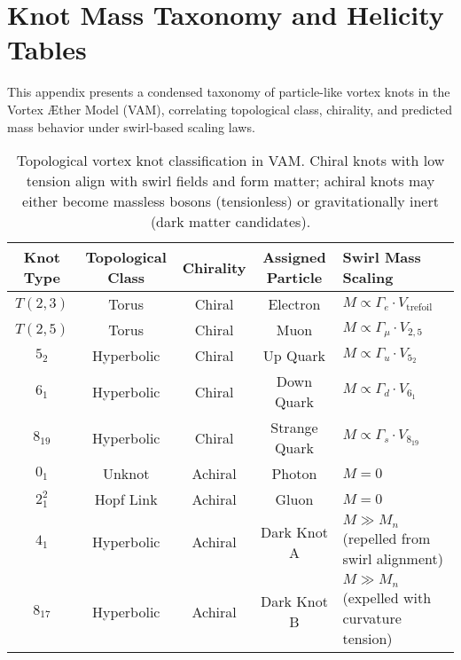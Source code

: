 \documentclass[preprint]{revtex4-2}
\begin{document}
        \section{Knot Mass Taxonomy and Helicity Tables}
        \label{sec:knot_mass_taxonomy}
            This appendix presents a condensed taxonomy of particle-like vortex knots in the Vortex \AE{}ther Model (VAM), correlating topological class, chirality, and predicted mass behavior under swirl-based scaling laws.
        
            \begin{table}[H]
                \centering
                \footnotesize
                \begin{tabular}{|c|c|c|c|l|}
                    \hline
                    \textbf{Knot Type} & \textbf{Topological Class} & \textbf{Chirality} & \textbf{Assigned Particle} & \textbf{Swirl Mass Scaling} \\
                    \hline
                    $T(2,3)$           & Torus            & Chiral   & Electron        & $M \propto \Gamma_{e} \cdot V_{\text{trefoil}}$ \\
                    $T(2,5)$           & Torus            & Chiral   & Muon            & $M \propto \Gamma_{\mu} \cdot V_{2,5}$ \\
                    $5_2$              & Hyperbolic       & Chiral   & Up Quark        & $M \propto \Gamma_{u} \cdot V_{5_2}$ \\
                    $6_1$              & Hyperbolic       & Chiral   & Down Quark      & $M \propto \Gamma_{d} \cdot V_{6_1}$ \\
                    $8_{19}$           & Hyperbolic       & Chiral   & Strange Quark   & $M \propto \Gamma_{s} \cdot V_{8_{19}}$ \\
                    $0_1$              & Unknot           & Achiral  & Photon          & $M = 0$ \\
                    $2_1^2$            & Hopf Link        & Achiral  & Gluon           & $M = 0$ \\
                    $4_1$              & Hyperbolic       & Achiral  & Dark Knot A     & $M \gg M_n$ (repelled from swirl alignment) \\
                    $8_{17}$           & Hyperbolic       & Achiral  & Dark Knot B     & $M \gg M_n$ (expelled with curvature tension) \\
                    \hline
                \end{tabular}
                \caption{Topological vortex knot classification in VAM. Chiral knots with low tension align with swirl fields and form matter; achiral knots may either become massless bosons (tensionless) or gravitationally inert (dark matter candidates).}
                \label{tab:knot_taxonomy}
            \end{table}
\end{document}
